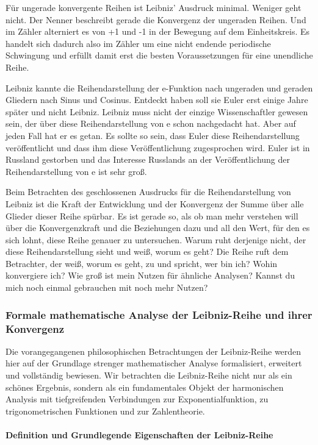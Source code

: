 \documentclass[a4paper, 12pt, twoside, openright]{report}
\theoremstyle{definition}
\theoremstyle{definition}
\begin{document}
Für ungerade konvergente Reihen ist Leibniz' Ausdruck minimal. Weniger geht nicht. Der Nenner beschreibt gerade die Konvergenz der ungeraden Reihen. Und im Zähler alterniert es von +1 und -1 in der Bewegung auf dem Einheitskreis. Es handelt sich dadurch also im Zähler um eine nicht endende periodische Schwingung und erfüllt damit erst die besten Voraussetzungen für eine unendliche Reihe.

Leibniz kannte die Reihendarstellung der e-Funktion nach ungeraden und geraden Gliedern nach Sinus und Cosinus. Entdeckt haben soll sie Euler erst einige Jahre später und nicht Leibniz. Leibniz muss nicht der einzige Wissenschaftler gewesen sein, der über diese Reihendarstellung von e schon nachgedacht hat. Aber auf jeden Fall hat er es getan. Es sollte so sein, dass Euler diese Reihendarstellung veröffentlicht und dass ihm diese Veröffentlichung zugesprochen wird. Euler ist in Russland gestorben und das Interesse Russlands an der Veröffentlichung der Reihendarstellung von e ist sehr groß.

Beim Betrachten des geschlossenen Ausdrucks für die Reihendarstellung von Leibniz ist die Kraft der Entwicklung und der Konvergenz der Summe über alle Glieder dieser Reihe spürbar. Es ist gerade so, als ob man mehr verstehen will über die Konvergenzkraft und die Beziehungen dazu und all den Wert, für den es sich lohnt, diese Reihe genauer zu untersuchen. Warum ruht derjenige nicht, der diese Reihendarstellung sieht und weiß, worum es geht? Die Reihe ruft dem Betrachter, der weiß, worum es geht, zu und spricht, wer bin ich? Wohin konvergiere ich? Wie groß ist mein Nutzen für ähnliche Analysen? Kannst du mich noch einmal gebrauchen mit noch mehr Nutzen?

\subsubsection*{Formale mathematische Analyse der Leibniz-Reihe und ihrer Konvergenz}

Die vorangegangenen philosophischen Betrachtungen der Leibniz-Reihe werden hier auf der Grundlage strenger mathematischer Analyse formalisiert, erweitert und vollständig bewiesen. Wir betrachten die Leibniz-Reihe nicht nur als ein schönes Ergebnis, sondern als ein fundamentales Objekt der harmonischen Analysis mit tiefgreifenden Verbindungen zur Exponentialfunktion, zu trigonometrischen Funktionen und zur Zahlentheorie.

\paragraph{Definition und Grundlegende Eigenschaften der Leibniz-Reihe}
\end{document}

